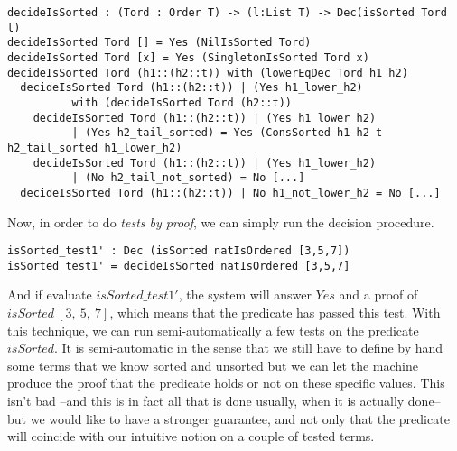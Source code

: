 \begin{lstlisting}
decideIsSorted : (Tord : Order T) -> (l:List T) -> Dec(isSorted Tord l)
decideIsSorted Tord [] = Yes (NilIsSorted Tord)
decideIsSorted Tord [x] = Yes (SingletonIsSorted Tord x)
decideIsSorted Tord (h1::(h2::t)) with (lowerEqDec Tord h1 h2)
  decideIsSorted Tord (h1::(h2::t)) | (Yes h1_lower_h2) 
          with (decideIsSorted Tord (h2::t))
    decideIsSorted Tord (h1::(h2::t)) | (Yes h1_lower_h2) 
          | (Yes h2_tail_sorted) = Yes (ConsSorted h1 h2 t h2_tail_sorted h1_lower_h2)
    decideIsSorted Tord (h1::(h2::t)) | (Yes h1_lower_h2) 
          | (No h2_tail_not_sorted) = No [...]
  decideIsSorted Tord (h1::(h2::t)) | No h1_not_lower_h2 = No [...]
\end{lstlisting}
Now, in order to do \emph{tests by proof}, we can simply run the decision procedure.

\begin{lstlisting}
isSorted_test1' : Dec (isSorted natIsOrdered [3,5,7])
isSorted_test1' = decideIsSorted natIsOrdered [3,5,7] 
\end{lstlisting}
And if evaluate $isSorted\_test1'$, the system will answer $Yes$ and a proof of $isSorted\ [3,\ 5,\ 7]$, which means that the predicate has passed this test. With this technique, we can run semi-automatically a few tests on the predicate $isSorted$. It is semi-automatic in the sense that we still have to define by hand some terms that we know sorted and unsorted but we can let the machine produce the proof that the predicate holds or not on these specific values. This isn't bad --and this is in fact all that is done usually, when it is actually done-- but we would like to have a stronger guarantee, and not only that the predicate will coincide with our intuitive notion on a couple of tested terms.





